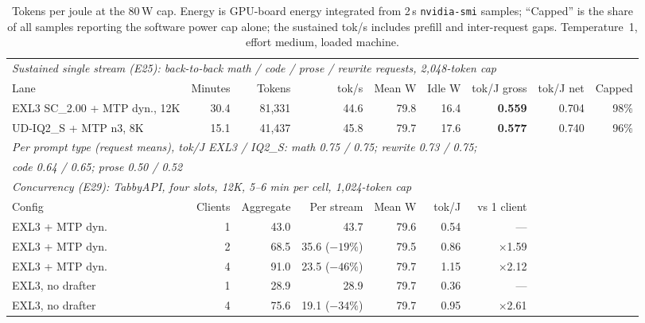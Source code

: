 \documentclass[11pt]{article}
\newcommand{\q}[1]{\texttt{#1}}
\begin{document}
\begin{table}[t]
\centering
\scriptsize
\setlength{\tabcolsep}{3.5pt}
\begin{tabular}{lrrrrrrrr}
\toprule
\multicolumn{9}{l}{\textit{Sustained single stream (E25): back-to-back math / code / prose / rewrite requests, 2,048-token cap}} \\
Lane & Minutes & Tokens & tok/s & Mean W & Idle W & tok/J gross & tok/J net & Capped \\
\midrule
EXL3 SC\_2.00 + MTP dyn., 12K & 30.4 & 81,331 & 44.6 & 79.8 & 16.4 & \textbf{0.559} & 0.704 & 98\% \\
UD-IQ2\_S + MTP n3, 8K & 15.1 & 41,437 & 45.8 & 79.7 & 17.6 & \textbf{0.577} & 0.740 & 96\% \\
\multicolumn{9}{l}{\textit{Per prompt type (request means), tok/J EXL3 / IQ2\_S: math 0.75 / 0.75; rewrite 0.73 / 0.75;}} \\
\multicolumn{9}{l}{\textit{code 0.64 / 0.65; prose 0.50 / 0.52}} \\
\midrule
\multicolumn{9}{l}{\textit{Concurrency (E29): TabbyAPI, four slots, 12K, 5--6 min per cell, 1,024-token cap}} \\
Config & Clients & Aggregate & Per stream & Mean W & tok/J & vs 1 client & & \\
\midrule
EXL3 + MTP dyn. & 1 & 43.0 & 43.7 & 79.6 & 0.54 & --- & & \\
EXL3 + MTP dyn. & 2 & 68.5 & 35.6 ($-19\%$) & 79.5 & 0.86 & $\times$1.59 & & \\
EXL3 + MTP dyn. & 4 & 91.0 & 23.5 ($-46\%$) & 79.7 & 1.15 & $\times$2.12 & & \\
EXL3, no drafter & 1 & 28.9 & 28.9 & 79.7 & 0.36 & --- & & \\
EXL3, no drafter & 4 & 75.6 & 19.1 ($-34\%$) & 79.7 & 0.95 & $\times$2.61 & & \\
\bottomrule
\end{tabular}
\caption{Tokens per joule at the 80\,W cap. Energy is GPU-board energy
integrated from 2\,s \q{nvidia-smi} samples; ``Capped'' is the share of all
samples reporting the software power cap alone; the sustained tok/s includes
prefill and inter-request gaps. Temperature~1, effort medium, loaded
machine.}
\label{tab:energy}
\end{table}
\end{document}
